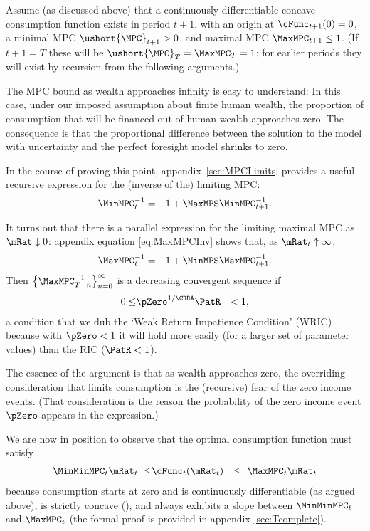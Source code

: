 \documentclass[titlepage]{\econtex}\providecommand{\texname}{BufferStockTheory}
\begin{document}
\newcommand{\NewMaxMinMPC}{\ushort{\MPC}}

Assume (as discussed above) that a continuously differentiable
concave consumption function exists in period $t+1$, with an origin at
$\cFunc_{t+1}(0)=0$, a minimal MPC $\NewMaxMinMPC_{t+1}>0$, and
maximal MPC $\MaxMPC_{t+1} \leq 1$.  (If $t+1 = T$ these will be
$\NewMaxMinMPC_{T}=\MaxMPC_{T}=1$; for earlier periods they will exist
by recursion from the following arguments.)

The MPC bound as wealth approaches infinity is easy to understand: In this case,
under our imposed assumption about finite human wealth, the proportion of consumption
that will be financed out of human wealth approaches zero. The
consequence is that the proportional difference between the solution to the
model with uncertainty and the perfect foresight model shrinks to zero.

\hypertarget{MPCnvrsLower}{}
In the course of proving this point, appendix~\ref{sec:MPCLimits}  provides a useful recursive expression for the (inverse of the) limiting MPC: 
\begin{eqnarray}
 \MinMPC_{t}^{-1} & = & 1+\MaxMPS \MinMPC_{t+1}^{-1} \label{eq:MinMPCInv}.
\end{eqnarray}

\hypertarget{MPCnvrsUpper}{}
\hypertarget{WRIC}{}
It turns out that there is a parallel expression for the limiting maximal 
MPC as $\mRat \downarrow 0$: appendix equation \eqref{eq:MaxMPCInv}  shows that, as $\mRat_{t} \uparrow \infty$,
\begin{eqnarray}
 \MaxMPC_{t}^{-1} & = & 1+\MinMPS \MaxMPC_{t+1}^{-1} \label{eq:MaxMPCInv}.
\end{eqnarray}
Then
$\left\{\MaxMPC_{T-n}^{-1}\right\} _{n=0}^{\infty}$ is a decreasing 
convergent sequence if
\begin{eqnarray}
  0 \leq & \pZero^{1/\CRRA} \PatR & < 1 \label{eq:WRIC},
\end{eqnarray}
a condition that we dub the `Weak Return Impatience Condition' (WRIC)
because with $\pZero < 1$ it will hold more easily (for a larger set of parameter
values) than the RIC ($\PatR < 1$).

The essence of the argument is that as wealth approaches zero, the overriding
consideration that limits consumption is the (recursive) fear of the zero
income events.  (That consideration is the reason the probability of the zero
income event $\pZero$ appears in the expression.)  

We are now in position to observe that the optimal consumption function must satisfy
\begin{eqnarray}
  \MinMinMPC_{t} \mRat_{t} ~ \leq &   \cFunc_{t}(\mRat_{t}) & \leq  ~ \MaxMPC_{t} \mRat_{t} \label{eq:cBounds}
\end{eqnarray}
because consumption starts at zero and is continuously
differentiable (as argued above), is strictly
concave (\cite{ckConcavity}), and always exhibits a
slope between $\MinMinMPC_{t}$ and $\MaxMPC_{t}$ (the formal proof is provided in appendix \ref{sec:Tcomplete}).
\end{document}
